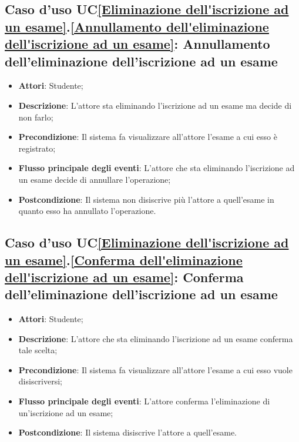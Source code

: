 \subsection{Caso d'uso UC\ref{Eliminazione dell'iscrizione ad un esame}.\ref{Annullamento dell'eliminazione dell'iscrizione ad un esame}: Annullamento dell'eliminazione dell'iscrizione ad un esame}
\begin{itemize}
	\item \textbf{Attori}: Studente;
	\item \textbf{Descrizione}: L'attore sta eliminando l'iscrizione ad un esame ma decide di non farlo;
	\item \textbf{Precondizione}: Il sistema fa visualizzare all'attore l'esame a cui esso è registrato;
	
	\item \textbf{Flusso principale degli eventi}: L'attore che sta eliminando l'iscrizione ad un esame decide di annullare l'operazione;
	\item \textbf{Postcondizione}: Il sistema non disiscrive più l'attore a quell'esame in quanto esso ha annullato l'operazione.
	
\end{itemize}

\subsection{Caso d'uso UC\ref{Eliminazione dell'iscrizione ad un esame}.\ref{Conferma dell'eliminazione dell'iscrizione ad un esame}: Conferma dell'eliminazione dell'iscrizione ad un esame}
\begin{itemize}
	\item \textbf{Attori}: Studente;
	\item \textbf{Descrizione}: L'attore che sta eliminando l'iscrizione ad un esame conferma tale scelta;
	\item \textbf{Precondizione}: Il sistema fa visualizzare all'attore l'esame a cui esso vuole disiscriversi;
	
	\item \textbf{Flusso principale degli eventi}: L'attore conferma l'eliminazione di un'iscrizione ad un esame;
	\item \textbf{Postcondizione}: Il sistema disiscrive l'attore a quell'esame.
	
\end{itemize}

